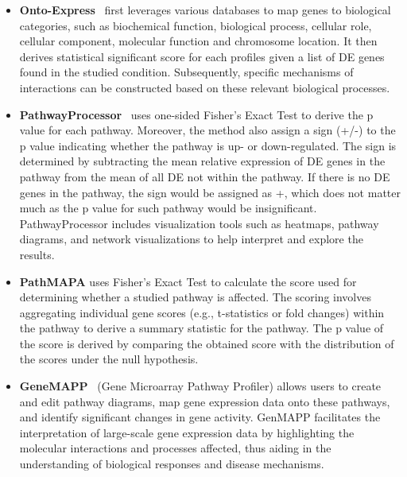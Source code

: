 \documentclass[Minh_PhD_thesis.tex]{subfiles}
\begin{document}
\begin{itemize}
\item \textbf{Onto-Express}~\cite{Khatri:2002, DraghiciOE2:2003} first leverages various databases to map genes to biological categories, such as biochemical function, biological process, cellular role, cellular component, molecular function and chromosome location. It then derives statistical significant score for each profiles given a list of DE genes found in the studied condition. Subsequently, specific mechanisms of interactions can be constructed based on these relevant biological processes.

\item \textbf{PathwayProcessor}~\cite{Grosu:2002} uses one-sided Fisher's Exact Test to derive the p value for each pathway. Moreover, the method also assign a sign (+/-) to the p value indicating whether the pathway is up- or down-regulated. The sign is determined by subtracting the mean relative expression of DE genes in the pathway from the mean of all DE not within the pathway. If there is no DE genes in the pathway, the sign would be assigned as +, which does not matter much as the p value for such pathway would be insignificant. PathwayProcessor includes visualization tools such as heatmaps, pathway diagrams, and network visualizations to help interpret and explore the results.

\item \textbf{PathMAPA} \cite{Pan:2003} uses Fisher's Exact Test to calculate the score used for determining whether a studied pathway is affected. The scoring  involves aggregating individual gene scores (e.g., t-statistics or fold changes) within the pathway to derive a summary statistic for the pathway. The p value of the score is derived by comparing the obtained score with the distribution of the scores under the null hypothesis. 


%
%

\item \textbf{GeneMAPP}~\cite{Dahlquist:2002} (Gene Microarray Pathway Profiler) allows users to create and edit pathway diagrams, map gene expression data onto these pathways, and identify significant changes in gene activity. GenMAPP facilitates the interpretation of large-scale gene expression data by highlighting the molecular interactions and processes affected, thus aiding in the understanding of biological responses and disease mechanisms.


\end{itemize}
\end{document}
